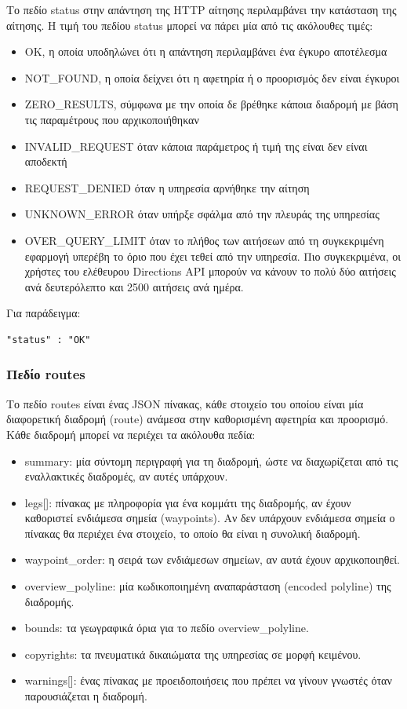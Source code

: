 Το πεδίο status στην απάντηση της HTTP αίτησης περιλαμβάνει την κατάσταση της αίτησης. Η τιμή του πεδίου status μπορεί να πάρει μία από τις ακόλουθες τιμές:
\begin{itemize}
 \item OK, η οποία υποδηλώνει ότι η απάντηση περιλαμβάνει ένα έγκυρο αποτέλεσμα 
 \item NOT\_FOUND, η οποία δείχνει ότι η αφετηρία ή ο προορισμός δεν είναι έγκυροι
 \item ZERO\_RESULTS, σύμφωνα με την οποία δε βρέθηκε κάποια διαδρομή με βάση τις παραμέτρους που αρχικοποιήθηκαν
 \item INVALID\_REQUEST όταν κάποια παράμετρος ή τιμή της είναι δεν είναι αποδεκτή
 \item REQUEST\_DENIED όταν η υπηρεσία αρνήθηκε την αίτηση 
 \item UNKNOWN\_ERROR όταν υπήρξε σφάλμα από την πλευράς της υπηρεσίας
 \item OVER\_QUERY\_LIMIT όταν το πλήθος των αιτήσεων από τη συγκεκριμένη εφαρμογή υπερέβη το όριο που έχει τεθεί από την υπηρεσία. Πιο 
συγκεκριμένα, οι χρήστες του ελέθευρου Directions API μπορούν να κάνουν το πολύ δύο αιτήσεις ανά δευτερόλεπτο και 2500 αιτήσεις ανά ημέρα.
\end{itemize}

Για παράδειγμα:

\begin{lstlisting}[basicstyle=\footnotesize\ttfamily, breaklines=true]
 "status" : "OK"
\end{lstlisting}

\subsubsection{Πεδίο routes}

Το πεδίο routes είναι ένας JSON πίνακας, κάθε στοιχείο του οποίου είναι μία διαφορετική διαδρομή (route) ανάμεσα στην καθορισμένη αφετηρία και προορισμό. 
Κάθε διαδρομή μπορεί να περιέχει τα ακόλουθα πεδία:

\begin{itemize}
 \item summary: μία σύντομη περιγραφή για τη διαδρομή, ώστε να διαχωρίζεται από τις εναλλακτικές διαδρομές, αν αυτές υπάρχουν.
 \item legs[]: πίνακας με πληροφορία για ένα κομμάτι της διαδρομής, αν έχουν καθοριστεί ενδιάμεσα σημεία (waypoints). Αν δεν υπάρχουν ενδιάμεσα σημεία ο πίνακας 
 θα περιέχει ένα στοιχείο, το οποίο θα είναι η συνολική διαδρομή.
 \item waypoint\_order: η σειρά των ενδιάμεσων σημείων, αν αυτά έχουν αρχικοποιηθεί.
 \item overview\_polyline: μία κωδικοποιημένη αναπαράσταση (encoded polyline) της διαδρομής.
 \item bounds: τα γεωγραφικά όρια για το πεδίο overview\_polyline.
 \item copyrights: τα πνευματικά δικαιώματα της υπηρεσίας σε μορφή κειμένου.
 \item warnings[]: ένας πίνακας με προειδοποιήσεις που πρέπει να γίνουν γνωστές όταν παρουσιάζεται η διαδρομή.
\end{itemize}

